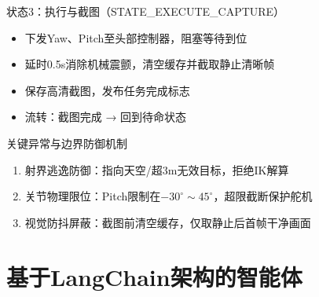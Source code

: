\documentclass{beamer}
\begin{document}
    \begin{frame}{状态3：执行与截图（STATE\_EXECUTE\_CAPTURE）}
        \begin{itemize}
            \item 下发Yaw、Pitch至头部控制器，阻塞等待到位
            \item 延时0.5s消除机械震颤，清空缓存并截取静止清晰帧
            \item 保存高清截图，发布任务完成标志
            \item 流转：截图完成 → 回到待命状态
        \end{itemize}
    \end{frame}

    \begin{frame}{关键异常与边界防御机制}
        \begin{enumerate}
            \item 射界逃逸防御：指向天空/超3m无效目标，拒绝IK解算
            \item 关节物理限位：Pitch限制在\( -30^\circ \sim 45^\circ \)，超限截断保护舵机
            \item 视觉防抖屏蔽：截图前清空缓存，仅取静止后首帧干净画面
        \end{enumerate}
    \end{frame}


    \section{基于LangChain架构的智能体}
\end{document}
